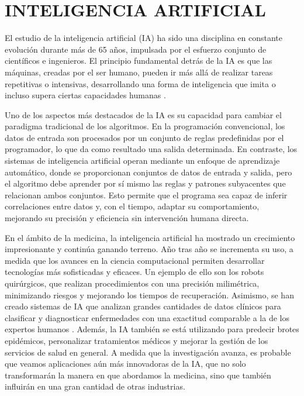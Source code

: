 \section{INTELIGENCIA ARTIFICIAL}

El estudio de la inteligencia artificial (IA) ha sido una disciplina en constante evolución durante más de 65 años, impulsada por el esfuerzo conjunto de científicos e ingenieros. El principio fundamental detrás de la IA es que las máquinas, creadas por el ser humano, pueden ir más allá de realizar tareas repetitivas o intensivas, desarrollando una forma de inteligencia que imita o incluso supera ciertas capacidades humanas .

Uno de los aspectos más destacados de la IA es su capacidad para cambiar el paradigma tradicional de los algoritmos. En la programación convencional, los datos de entrada son procesados por un conjunto de reglas predefinidas por el programador, lo que da como resultado una salida determinada. En contraste, los sistemas de inteligencia artificial operan mediante un enfoque de aprendizaje automático, donde se proporcionan conjuntos de datos de entrada y salida, pero el algoritmo debe aprender por sí mismo las reglas y patrones subyacentes que relacionan ambos conjuntos. Esto permite que el programa sea capaz de inferir correlaciones entre datos y, con el tiempo, adaptar su comportamiento, mejorando su precisión y eficiencia sin intervención humana directa.

En el ámbito de la medicina, la inteligencia artificial ha mostrado un crecimiento impresionante y continúa ganando terreno. Año tras año se incrementa su uso, a medida que los avances en la ciencia computacional permiten desarrollar tecnologías más sofisticadas y eficaces. Un ejemplo de ello son los robots quirúrgicos, que realizan procedimientos con una precisión milimétrica, minimizando riesgos y mejorando los tiempos de recuperación. Asimismo, se han creado sistemas de IA que analizan grandes cantidades de datos clínicos para clasificar y diagnosticar enfermedades con una exactitud comparable a la de los expertos humanos . Además, la IA también se está utilizando para predecir brotes epidémicos, personalizar tratamientos médicos y mejorar la gestión de los servicios de salud en general. A medida que la investigación avanza, es probable que veamos aplicaciones aún más innovadoras de la IA, que no solo transformarán la manera en que abordamos la medicina, sino que también influirán en una gran cantidad de otras industrias.

